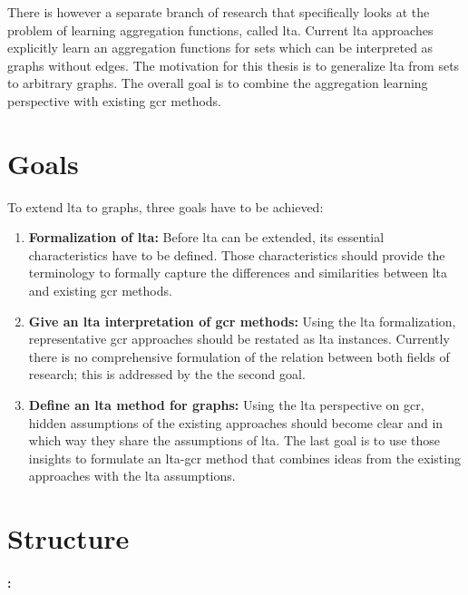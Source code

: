 There is however a separate branch of research that specifically looks at the problem of learning aggregation functions, called \ac{lta}.
Current \ac{lta} approaches explicitly learn an aggregation functions for sets which can be interpreted as graphs without edges.
The motivation for this thesis is to generalize \ac{lta} from sets to arbitrary graphs.
The overall goal is to combine the aggregation learning perspective with existing \ac{gcr} methods.

\section{Goals}%
\label{sec:intro:goals}

To extend \ac{lta} to graphs, three goals have to be achieved:
\begin{enumerate}[label=\textbf{\arabic*.}]
	\item \textbf{Formalization of \ac{lta}:}
		Before \ac{lta} can be extended, its essential characteristics have to be defined.
		Those characteristics should provide the terminology to formally capture the differences and similarities between \ac{lta} and existing \ac{gcr} methods.
	\item \textbf{Give an \ac{lta} interpretation of \ac{gcr} methods:}
		Using the \ac{lta} formalization, representative \ac{gcr} approaches should be restated as \ac{lta} instances.
		Currently there is no comprehensive formulation of the relation between both fields of research;
		this is addressed by the the second goal.
	\item \textbf{Define an \ac{lta} method for graphs:}
		Using the \ac{lta} perspective on \ac{gcr}, hidden assumptions of the existing approaches should become clear and in which way they share the assumptions of \ac{lta}.
		The last goal is to use those insights to formulate an \ac{lta}-\ac{gcr} method that combines ideas from the existing approaches with the \ac{lta} assumptions.
\end{enumerate}

\section{Structure}%
\label{sec:intro:structure}

\paragraph{: }

